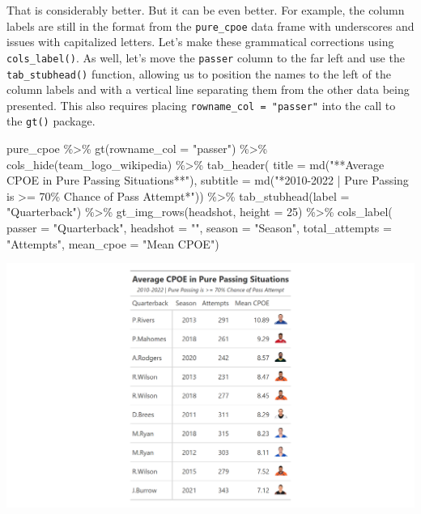 \documentclass[
  letterpaper,
]{krantz}
\newenvironment{Shaded}{\begin{snugshade}}{\end{snugshade}}
\newcommand{\AttributeTok}[1]{\textcolor[rgb]{0.40,0.45,0.13}{#1}}
\newcommand{\DecValTok}[1]{\textcolor[rgb]{0.68,0.00,0.00}{#1}}
\newcommand{\FunctionTok}[1]{\textcolor[rgb]{0.28,0.35,0.67}{#1}}
\newcommand{\NormalTok}[1]{\textcolor[rgb]{0.00,0.23,0.31}{#1}}
\newcommand{\SpecialCharTok}[1]{\textcolor[rgb]{0.37,0.37,0.37}{#1}}
\newcommand{\StringTok}[1]{\textcolor[rgb]{0.13,0.47,0.30}{#1}}
\begin{document}
That is considerably better. But it can be even better. For example, the
column labels are still in the format from the \texttt{pure\_cpoe} data
frame with underscores and issues with capitalized letters. Let's make
these grammatical corrections using \texttt{cols\_label()}. As well,
let's move the \texttt{passer} column to the far left and use the
\texttt{tab\_stubhead()} function, allowing us to position the names to
the left of the column labels and with a vertical line separating them
from the other data being presented. This also requires placing
\texttt{rowname\_col\ =\ "passer"} into the call to the \texttt{gt()}
package.

\begin{Shaded}
\begin{Highlighting}[]
\NormalTok{pure\_cpoe }\SpecialCharTok{\%\textgreater{}\%}
  \FunctionTok{gt}\NormalTok{(}\AttributeTok{rowname\_col =} \StringTok{"passer"}\NormalTok{) }\SpecialCharTok{\%\textgreater{}\%}
  \FunctionTok{cols\_hide}\NormalTok{(team\_logo\_wikipedia) }\SpecialCharTok{\%\textgreater{}\%}
  \FunctionTok{tab\_header}\NormalTok{(}
    \AttributeTok{title =} \FunctionTok{md}\NormalTok{(}\StringTok{"**Average CPOE in Pure Passing Situations**"}\NormalTok{),}
    \AttributeTok{subtitle =} \FunctionTok{md}\NormalTok{(}\StringTok{"*2010{-}2022  |  Pure Passing is \textgreater{}= 70\% Chance of Pass Attempt*"}\NormalTok{)) }\SpecialCharTok{\%\textgreater{}\%}
  \FunctionTok{tab\_stubhead}\NormalTok{(}\AttributeTok{label =} \StringTok{"Quarterback"}\NormalTok{) }\SpecialCharTok{\%\textgreater{}\%}
  \FunctionTok{gt\_img\_rows}\NormalTok{(headshot, }\AttributeTok{height =} \DecValTok{25}\NormalTok{) }\SpecialCharTok{\%\textgreater{}\%}
  \FunctionTok{cols\_label}\NormalTok{(}
    \AttributeTok{passer =} \StringTok{"Quarterback"}\NormalTok{,}
    \AttributeTok{headshot =} \StringTok{""}\NormalTok{,}
    \AttributeTok{season =} \StringTok{"Season"}\NormalTok{,}
    \AttributeTok{total\_attempts =} \StringTok{"Attempts"}\NormalTok{,}
    \AttributeTok{mean\_cpoe =} \StringTok{"Mean CPOE"}\NormalTok{)}
\end{Highlighting}
\end{Shaded}

\includegraphics[width=6.61in,height=\textheight]{images/gt_table_2.png}
\end{document}
